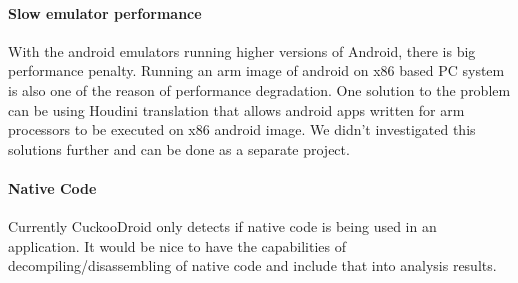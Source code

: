 \documentclass[../main.tex]{subfile}
\begin{document}
		\paragraph{Slow emulator performance} With the android emulators running higher versions of Android, there is big performance penalty. Running an arm image of android on x86 based PC system is also one of the reason of performance degradation. One solution to the problem can be using Houdini translation that allows android apps written for arm processors to be executed on x86 android image. We didn't investigated this solutions further and can be done as a separate project.
		
		\paragraph{Native Code} Currently CuckooDroid only detects if native code is being used in an application. It would be nice to have the capabilities of decompiling/disassembling of native code and include that into analysis results.
\end{document}
